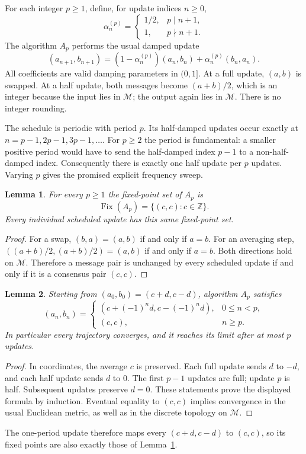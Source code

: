 \documentclass[11pt]{article}
\newtheorem{lemma}{Lemma}
\begin{document}
For each integer $p\geq1$, define, for update indices $n\geq0$,
\[
 \alpha^{(p)}_n=
 \begin{cases}
  1/2,&p\mid n+1,\\
  1,&p\nmid n+1.
 \end{cases}
\]
The algorithm $A_p$ performs the usual damped update
\begin{equation}\label{eq:iteration}
 (a_{n+1},b_{n+1})
 =(1-\alpha^{(p)}_n)(a_n,b_n)
       +\alpha^{(p)}_n(b_n,a_n).
\end{equation}
All coefficients are valid damping parameters in $(0,1]$. At a full update,
$(a,b)$ is swapped. At a half update, both messages become $(a+b)/2$,
which is an integer because the input lies in $\mathcal M$; the output
again lies in $\mathcal M$. There is no integer rounding.

The schedule is periodic with period $p$. Its half-damped updates occur
exactly at $n=p-1,2p-1,3p-1,\ldots$. For $p\geq2$ the period is fundamental:
a smaller positive period would have to send the half-damped index $p-1$
to a non-half-damped index. Consequently there is exactly one half update
per $p$ updates. Varying $p$ gives the promised explicit frequency sweep.

\begin{lemma}\label{lem:fixed}
For every $p\geq1$ the fixed-point set of $A_p$ is
\[
 \operatorname{Fix}(A_p)=\{(c,c):c\in\mathbb Z\}.
\]
Every individual scheduled update has this same fixed-point set.
\end{lemma}
\begin{proof}
For a swap, $(b,a)=(a,b)$ if and only if $a=b$. For an averaging step,
$((a+b)/2,(a+b)/2)=(a,b)$ if and only if $a=b$. Both directions hold on
$\mathcal M$. Therefore a message pair is unchanged by every scheduled
update if and only if it is a consensus pair $(c,c)$.
\end{proof}

\begin{lemma}\label{lem:convergence}
Starting from $(a_0,b_0)=(c+d,c-d)$, algorithm $A_p$ satisfies
\[
 (a_n,b_n)=
 \begin{cases}
 (c+(-1)^n d,c-(-1)^n d),&0\leq n<p,\\
 (c,c),&n\geq p.
 \end{cases}
\]
In particular every trajectory converges, and it reaches its limit after
at most $p$ updates.
\end{lemma}
\begin{proof}
In coordinates, the average $c$ is preserved. Each full update sends
$d$ to $-d$, and each half update sends $d$ to $0$. The first $p-1$
updates are full; update $p$ is half. Subsequent updates preserve $d=0$.
These statements prove the displayed formula by induction. Eventual
equality to $(c,c)$ implies convergence in the usual Euclidean metric,
as well as in the discrete topology on $\mathcal M$.
\end{proof}
The one-period update therefore maps every $(c+d,c-d)$ to $(c,c)$,
so its fixed points are also exactly those of Lemma~\ref{lem:fixed}.
\end{document}

